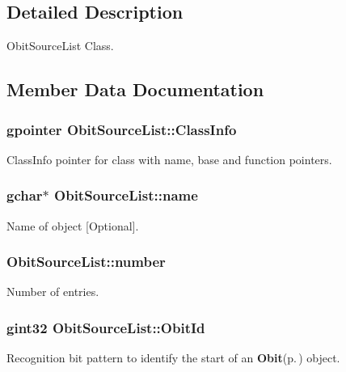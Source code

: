 \subsection{Detailed Description}
Obit\-Source\-List Class. 



\subsection{Member Data Documentation}
\subsubsection{\setlength{\rightskip}{0pt plus 5cm}gpointer {\bf Obit\-Source\-List::Class\-Info}}\label{structObitSourceList_o1}


Class\-Info pointer for class with name, base and function pointers. 

\subsubsection{\setlength{\rightskip}{0pt plus 5cm}gchar$\ast$ {\bf Obit\-Source\-List::name}}\label{structObitSourceList_o3}


Name of object [Optional]. 

\subsubsection{ {\bf Obit\-Source\-List::number}}\label{structObitSourceList_o4}


Number of entries. 

\subsubsection{\setlength{\rightskip}{0pt plus 5cm}gint32 {\bf Obit\-Source\-List::Obit\-Id}}\label{structObitSourceList_o0}


Recognition bit pattern to identify the start of an {\bf Obit}{\rm (p.\,\pageref{structObit})} object. 

